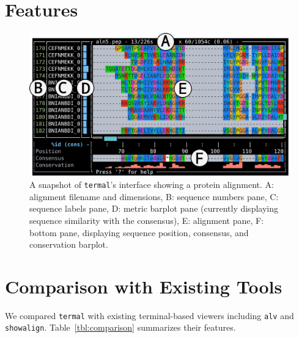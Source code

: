 \documentclass[11pt]{article}
\begin{document}
\section*{Features}

\begin{figure}[htbp]
\centering
	\includegraphics[width=\textwidth]{figure-1.pdf}
\caption{%
	A snapshot of \texttt{termal}'s interface showing a protein alignment. A:
	alignment filename and dimensions, B: sequence numbers pane, C: sequence
	labels pane, D: metric barplot pane (currently displaying sequence similarity
	with the consensus), E: alignment pane, F: bottom pane, displaying sequence
	position, consensus, and conservation barplot. \\
	}
\end{figure}


\section*{Comparison with Existing Tools}

We compared \texttt{termal} with existing terminal-based viewers including
\texttt{alv} and \texttt{showalign}. Table~\ref{tbl:comparison} summarizes their
features.
\end{document}
